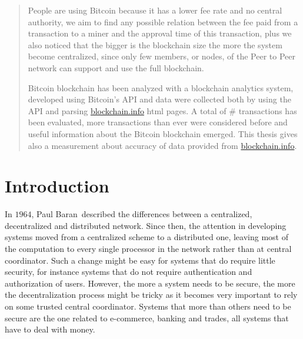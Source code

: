 \documentclass[USenglish]{uit-thesis}
\begin{document}
\begin{abstract}
People are using Bitcoin because 
it has a lower fee rate and no central authority, we aim to find any
possible relation between the fee paid from a transaction to a
miner and the approval time of this transaction, plus we also noticed that
the bigger is the blockchain size the more the system become
centralized, since only few members, or nodes, of the Peer to Peer network can
support and use the full blockchain.

Bitcoin blockchain has been analyzed with a blockchain analytics system,
developed using Bitcoin's API and data were collected both by using the
API and parsing \url{blockchain.info} \gls{html} pages.
A total of \# transactions has been evaluated, more transactions than ever were
considered before and useful information about the Bitcoin blockchain emerged.
This thesis gives also a measurement about accuracy of data
provided from \url{blockchain.info}.
\end{abstract}

%

\tableofcontents

\listofdefinition

\mainmatter
\chapter{Introduction}
\label{chap:introduction}



In $1964$, Paul Baran\,\cite{Baran1964:ODC}
described the differences
between a centralized, decentralized and distributed
network. Since then, the attention
in developing systems moved from a centralized scheme to a distributed one,
leaving most of the computation to every single processor in the network
rather than at central coordinator.
Such a change might be easy for systems that do require little
security, for instance systems that do not require authentication
and authorization of users.
However, the more a system needs to be secure, the more the decentralization
process might be tricky as it becomes very important to rely on
some trusted central coordinator. Systems that more than others need
to be secure are the one related to e-commerce, banking and trades, all
systems that have to deal with money.
\end{document}
